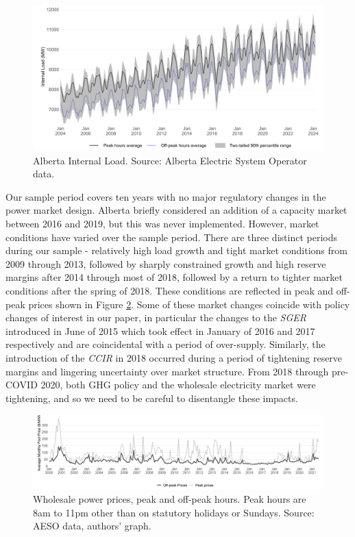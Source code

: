 \documentclass[12pt]{article}
\begin{document}
\begin{figure}[t]%
	\centering \vspace{-.25cm} \includegraphics[width=6.5in]{../images/loads_clean.png}
\vspace{-0.75cm}	\caption{Alberta Internal Load. Source: Alberta Electric System Operator data.}
\label{fig:ab_load}
\end{figure}

Our sample period covers ten years with no major regulatory changes in the power market design. Alberta briefly considered an addition of a capacity market between 2016 and 2019, but this was never implemented. However, market conditions have varied over the sample period. There are three distinct periods during our sample - relatively high load growth and tight market conditions from 2009 through 2013, followed by sharply constrained growth and high reserve margins after 2014 through most of 2018, followed by a return to tighter market conditions after the spring of 2018. These conditions are reflected in peak and off-peak prices shown in Figure \ref{fig:ab_prices}. Some of these market changes coincide with policy changes of interest in our paper, in particular the changes to the \emph{SGER} introduced in June of 2015 which took effect in January of 2016 and 2017 respectively and are coincidental with a period of over-supply. Similarly, the introduction of the \emph{CCIR} in 2018 occurred during a period of tightening reserve margins and lingering uncertainty over market structure. From 2018 through pre-COVID 2020, both GHG policy and the wholesale electricity market were tightening, and so we need to be careful to disentangle these impacts.

\begin{figure}[t]%
	\centering \vspace{-.25cm} \includegraphics[width=6.5in]{../images/peak_prices.png}
\vspace{-0.75cm}	\caption{Wholesale power prices, peak and off-peak hours. Peak hours are 8am to 11pm other than on statutory holidays or Sundays. Source: AESO data, authors' graph.}
\label{fig:ab_prices}
\end{figure}
\end{document}
